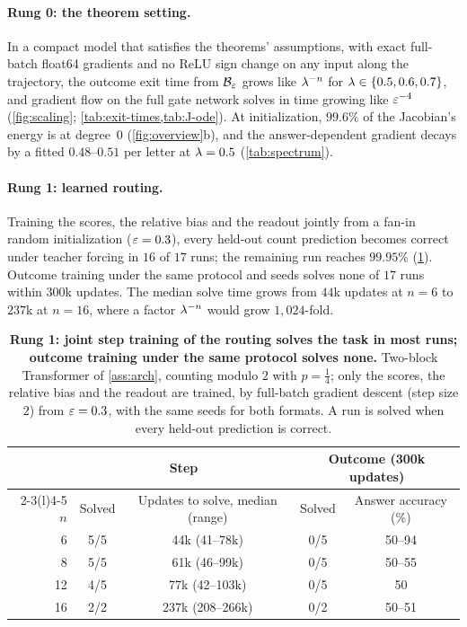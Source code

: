 \paragraph{Rung 0: the theorem setting.} In a compact model that satisfies the theorems' assumptions, with exact full-batch float64
gradients and no ReLU sign change on any input along the trajectory, the outcome exit time from $\mathcal B_{\varepsilon}$ grows like $\lambda^{-n}$ for
$\lambda\in\{0.5,0.6,0.7\}$, and gradient flow on the full gate network solves in time growing like
$\varepsilon^{-4}$ (\cref{fig:scaling}; \cref{tab:exit-times,tab:J-ode}).
At initialization, $99.6\%$ of the Jacobian's energy is at degree~$0$ (\cref{fig:overview}b), and the answer-dependent gradient decays by a
fitted $0.48$--$0.51$ per letter at $\lambda=0.5$ (\cref{tab:spectrum}).

\paragraph{Rung 1: learned routing.} Training the scores, the relative bias and the readout jointly from a fan-in random initialization
($\varepsilon=0.3$), every held-out count prediction becomes correct under teacher forcing in $16$ of $17$ runs; the remaining run reaches $99.95\%$
(\cref{tab:reach}). Outcome training under the same protocol and seeds solves none of $17$ runs within $300$k updates. The median solve
time grows from $44$k updates at $n=6$ to $237$k at $n=16$, where a factor $\lambda^{-n}$ would grow $1{,}024$-fold.

\begin{table}[t]
\caption{\textbf{Rung 1: joint step training of the routing solves the task in most runs; outcome training under the same protocol solves
none.} Two-block Transformer of \cref{ass:arch}, counting modulo $2$ with $p=\tfrac{1}{4}$; only the scores, the relative bias and the
readout are trained, by full-batch gradient descent (step size $2$) from $\varepsilon=0.3$, with the same seeds for both formats. A run is
solved when every held-out prediction is correct.}
\label{tab:reach}
\centering\small
\begin{tabular}{@{}rcccc@{}}
\toprule
 & \multicolumn{2}{c}{Step} & \multicolumn{2}{c}{Outcome (300k updates)}\\
\cmidrule(lr){2-3}\cmidrule(l){4-5}
$n$ & Solved & Updates to solve, median (range) & Solved & Answer accuracy (\%)\\
\midrule
6  & 5/5 & 44k (41--78k)   & 0/5 & 50--94\\
8  & 5/5 & 61k (46--99k)   & 0/5 & 50--55\\
12 & 4/5 & 77k (42--103k)  & 0/5 & 50\\
16 & 2/2 & 237k (208--266k) & 0/2 & 50--51\\
\bottomrule
\end{tabular}
\end{table}

